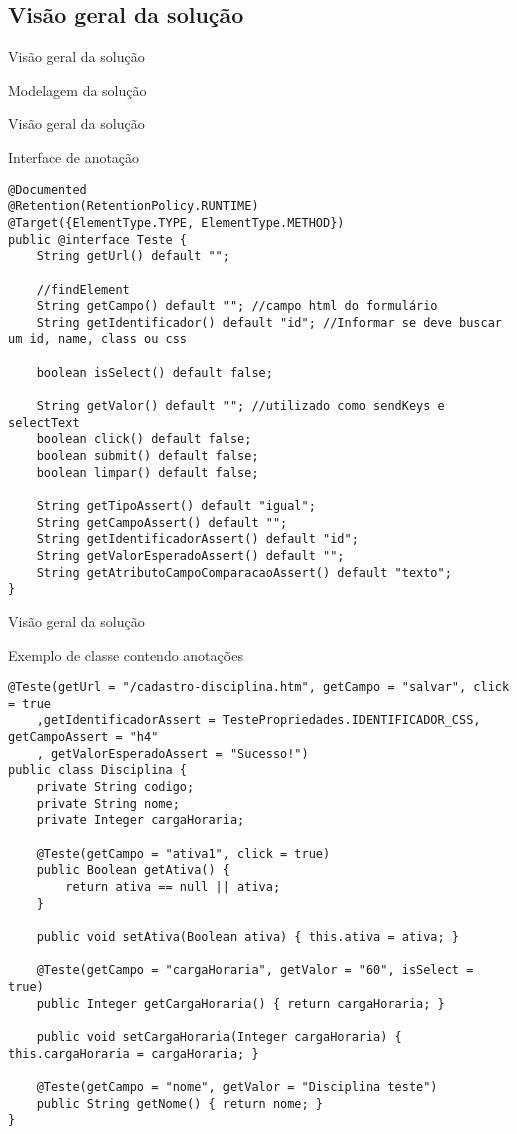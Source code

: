 \documentclass{beamer}
\begin{document}
\subsection{Visão geral da solução}
\begin{frame}{Visão geral da solução}
    \item Modelagem da solução
	\begin{center}\end{center}
\end{frame}
\begin{frame}[fragile]{Visão geral da solução}
    \item Interface de anotação
    \begin{lstlisting}
@Documented
@Retention(RetentionPolicy.RUNTIME)
@Target({ElementType.TYPE, ElementType.METHOD})
public @interface Teste {
    String getUrl() default "";

    //findElement
    String getCampo() default ""; //campo html do formulário
    String getIdentificador() default "id"; //Informar se deve buscar um id, name, class ou css

    boolean isSelect() default false;

    String getValor() default ""; //utilizado como sendKeys e selectText
    boolean click() default false;
    boolean submit() default false;
    boolean limpar() default false;

    String getTipoAssert() default "igual";
    String getCampoAssert() default "";
    String getIdentificadorAssert() default "id";
    String getValorEsperadoAssert() default "";
    String getAtributoCampoComparacaoAssert() default "texto";
}
	\end{lstlisting}
\end{frame}
\begin{frame}[fragile]{Visão geral da solução}
    \item Exemplo de classe contendo anotações
    \begin{lstlisting}
@Teste(getUrl = "/cadastro-disciplina.htm", getCampo = "salvar", click = true
    ,getIdentificadorAssert = TestePropriedades.IDENTIFICADOR_CSS, getCampoAssert = "h4"
    , getValorEsperadoAssert = "Sucesso!")
public class Disciplina {
    private String codigo;
    private String nome;
    private Integer cargaHoraria;

    @Teste(getCampo = "ativa1", click = true)
    public Boolean getAtiva() {
        return ativa == null || ativa;
    }

    public void setAtiva(Boolean ativa) { this.ativa = ativa; }

    @Teste(getCampo = "cargaHoraria", getValor = "60", isSelect = true)
    public Integer getCargaHoraria() { return cargaHoraria; }

    public void setCargaHoraria(Integer cargaHoraria) { this.cargaHoraria = cargaHoraria; }

    @Teste(getCampo = "nome", getValor = "Disciplina teste")
    public String getNome() { return nome; }
}
	\end{lstlisting}
\end{frame}
\end{document}

